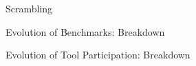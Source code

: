 \documentclass{beamer}
\begin{document}

\begin{frame}{Scrambling}

\end{frame}



\begin{frame}{Evolution of Benchmarks: Breakdown}

\end{frame}


\begin{frame}{Evolution of Tool Participation: Breakdown}

\end{frame}
\end{document}

